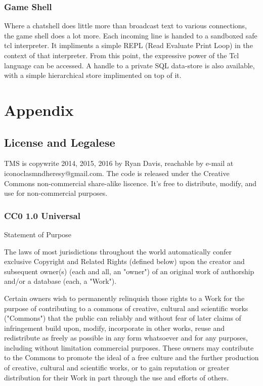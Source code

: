 \documentclass[10pt,letterpaper,twoside]{book}
\begin{document}
\section{Game Shell}
Where a chatshell does little more than broadcast text to various connections, the game shell does a lot more.
Each incoming line is handed to a sandboxed safe tcl interpreter.
It impliments a simple REPL (Read Evaluate Print Loop) in the context of that interpreter.
From this point, the expressive power of the Tcl language can be accessed.
A handle to a private SQL data-store is also available, with a simple hierarchical store implimented on top of it.
\backmatter
\part{Appendix}
\chapter{License and Legalese}
TMS is copywrite 2014, 2015, 2016 by Ryan Davis, reachable by e-mail at iconoclasmndheresy@gmail.com.
The code is released under the Creative Commons non-commercial share-alike liscence. It's free to distribute, modify, and use for non-commercial purposes.


\section*{CC0 1.0 Universal}

Statement of Purpose

The laws of most jurisdictions throughout the world automatically confer
exclusive Copyright and Related Rights (defined below) upon the creator and
subsequent owner(s) (each and all, an "owner") of an original work of
authorship and/or a database (each, a "Work").

Certain owners wish to permanently relinquish those rights to a Work for the
purpose of contributing to a commons of creative, cultural and scientific
works ("Commons") that the public can reliably and without fear of later
claims of infringement build upon, modify, incorporate in other works, reuse
and redistribute as freely as possible in any form whatsoever and for any
purposes, including without limitation commercial purposes. These owners may
contribute to the Commons to promote the ideal of a free culture and the
further production of creative, cultural and scientific works, or to gain
reputation or greater distribution for their Work in part through the use and
efforts of others.
\end{document}
